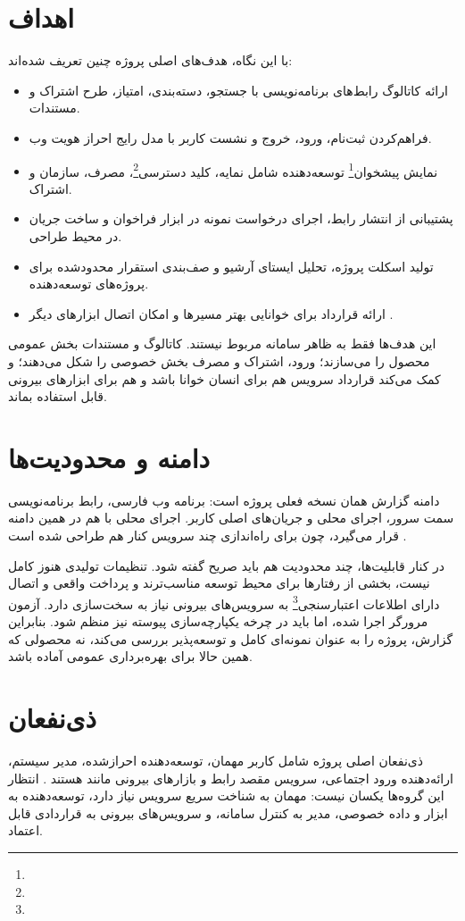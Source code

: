 \section{اهداف}
با این نگاه، هدف‌های اصلی پروژه چنین تعریف شده‌اند:
\begin{itemize}
  \item ارائه کاتالوگ رابط‌های برنامه‌نویسی با جستجو، دسته‌بندی، امتیاز، طرح اشتراک و مستندات.
  \item فراهم‌کردن ثبت‌نام، ورود، خروج و نشست کاربر با مدل رایج احراز هویت وب.
  \item نمایش پیشخوان\footnote{} توسعه‌دهنده شامل نمایه، کلید دسترسی\footnote{}، مصرف، سازمان و اشتراک.
  \item پشتیبانی از انتشار رابط، اجرای درخواست نمونه در ابزار فراخوان و ساخت جریان در محیط طراحی.
  \item تولید اسکلت پروژه، تحلیل ایستای آرشیو و صف‌بندی استقرار محدودشده برای پروژه‌های توسعه‌دهنده.
  \item ارائه قرارداد  برای خوانایی بهتر مسیرها و امکان اتصال ابزارهای دیگر \cite{openapi}.
\end{itemize}

این هدف‌ها فقط به ظاهر سامانه مربوط نیستند. کاتالوگ و مستندات بخش عمومی محصول را می‌سازند؛ ورود، اشتراک و مصرف بخش خصوصی را شکل می‌دهند؛ و  کمک می‌کند قرارداد سرویس هم برای انسان خوانا باشد و هم برای ابزارهای بیرونی قابل استفاده بماند.

\section{دامنه و محدودیت‌ها}
دامنه گزارش همان نسخه فعلی پروژه است: برنامه وب فارسی، رابط برنامه‌نویسی سمت سرور، اجرای محلی و جریان‌های اصلی کاربر. اجرای محلی با  هم در همین دامنه قرار می‌گیرد، چون برای راه‌اندازی چند سرویس کنار هم طراحی شده است \cite{docker}.

در کنار قابلیت‌ها، چند محدودیت هم باید صریح گفته شود. تنظیمات تولیدی هنوز کامل نیست، بخشی از رفتارها برای محیط توسعه مناسب‌ترند و پرداخت واقعی و اتصال دارای اطلاعات اعتبارسنجی\footnote{} به سرویس‌های بیرونی نیاز به سخت‌سازی دارد. آزمون مرورگر اجرا شده، اما باید در چرخه یکپارچه‌سازی پیوسته نیز منظم شود. بنابراین گزارش، پروژه را به عنوان نمونه‌ای کامل و توسعه‌پذیر بررسی می‌کند، نه محصولی که همین حالا برای بهره‌برداری عمومی آماده باشد.

\section{ذی‌نفعان}
ذی‌نفعان اصلی پروژه شامل کاربر مهمان، توسعه‌دهنده احرازشده، مدیر سیستم، ارائه‌دهنده ورود اجتماعی، سرویس مقصد رابط و بازارهای بیرونی مانند  هستند \cite{rapidapi}. انتظار این گروه‌ها یکسان نیست: مهمان به شناخت سریع سرویس نیاز دارد، توسعه‌دهنده به ابزار و داده خصوصی، مدیر به کنترل سامانه، و سرویس‌های بیرونی به قراردادی قابل اعتماد.

